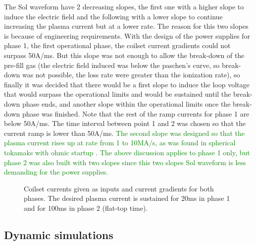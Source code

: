 \documentclass[a4paper,12pt,oneside]{book}
\begin{document}
The Sol waveform have 2 decreasing slopes, the first one with a higher slope to induce the electric field and the following with a lower slope to continue increasing the plasma current but at a lower rate. The reason for this two slopes is because of engineering requirements. With the design of the power supplies for phase 1, the first operational phase, the coilset current gradients could not surpass 50A/ms. But this slope was not enough to allow the break-down of the pre-fill gas (the electric field induced was below the paschen's curve, so break-down was not possible, the loss rate were greater than the ionization rate), so finally it was decided that there would be a first slope to induce the loop voltage that would surpass the operational limits and would be sustained until the break-down phase ends, and another slope within the operational limits once the break-down phase was finished. Note that the rest of the ramp currents for phase 1 are below 50A/ms. The time interval between point 1 and 2 was chosen so that the current ramp is lower than 50A/ms. \textcolor{green}{The second slope was designed so that the plasma current rises up at rate from 1 to 10MA/s, as was found in spherical tokamaks with ohmic startup \cite{Lazarus_1998, VEST_2013, ASDEX, HL_2A}. The above discussion applies to phase 1 only, but phase 2 was also built with two slopes since this two slopes Sol waveform is less demanding for the power supplies.}

\begin{figure}[h!]
\centering
{}
\hfill
{}

\hfill
{}

\caption{Coilset currents given as inputs and current gradients for both phases. The desired plasma current is sustained for 20ms in phase 1 and for 100ms in phase 2 (flat-top time).}
\label{fig_Input_currents}
\end{figure}


\subsection{Dynamic simulations}
\end{document}
